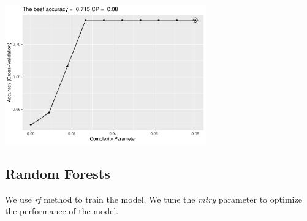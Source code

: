 \documentclass[]{article}
\newenvironment{Shaded}{\begin{snugshade}}{\end{snugshade}}
\newcommand{\CommentTok}[1]{\textcolor[rgb]{0.56,0.35,0.01}{\textit{#1}}}
\newcommand{\DataTypeTok}[1]{\textcolor[rgb]{0.13,0.29,0.53}{#1}}
\newcommand{\KeywordTok}[1]{\textcolor[rgb]{0.13,0.29,0.53}{\textbf{#1}}}
\newcommand{\NormalTok}[1]{#1}
\newcommand{\OperatorTok}[1]{\textcolor[rgb]{0.81,0.36,0.00}{\textbf{#1}}}
\newcommand{\StringTok}[1]{\textcolor[rgb]{0.31,0.60,0.02}{#1}}
\begin{document}
\begin{center}
\includegraphics[width=0.65\textwidth]{LiverDisease_files/figure-latex/unnamed-chunk-31-1.pdf}
\end{center}

\begin{Shaded}
\end{Shaded}

\subsection{Random Forests}

We use \emph{rf} method to train the model. We tune the \emph{mtry}
parameter to optimize the performance of the model.
\end{document}
